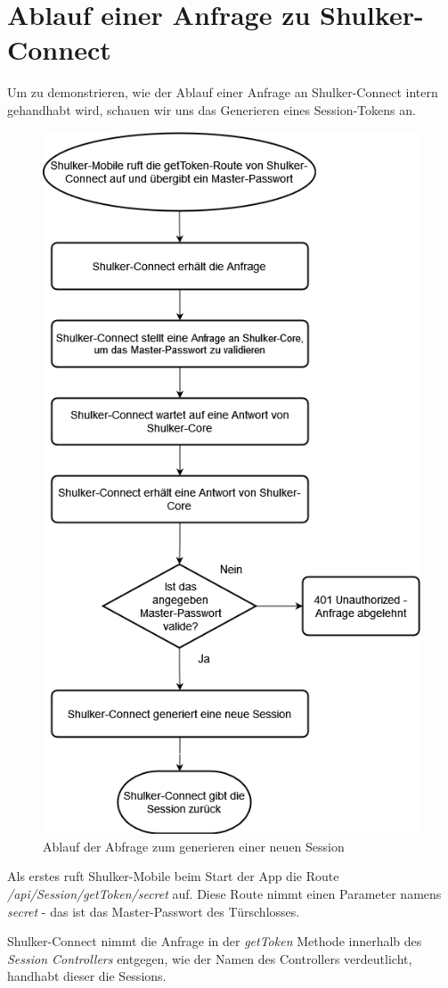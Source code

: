 \section{Ablauf einer Anfrage zu Shulker-Connect}
Um zu demonstrieren, wie der Ablauf einer Anfrage an Shulker-Connect intern gehandhabt wird, schauen wir uns das Generieren
eines Session-Tokens an.

\begin{figure}[H]
    \begin{center}
        \includegraphics[width=.6\textwidth]{images/connect/AblaufGetToken.png}
        \caption{Ablauf der Abfrage zum generieren einer neuen Session}
    \end{center}
\end{figure}

Als erstes ruft Shulker-Mobile beim Start der App die Route \textit{/api/Session/getToken/{secret}} auf.
Diese Route nimmt einen Parameter namens \textit{secret} - das ist das Master-Passwort des Türschlosses.

Shulker-Connect nimmt die Anfrage in der \textit{getToken} Methode innerhalb des \textit{Session Controllers} entgegen, 
wie der Namen des Controllers verdeutlicht, handhabt dieser die Sessions.

